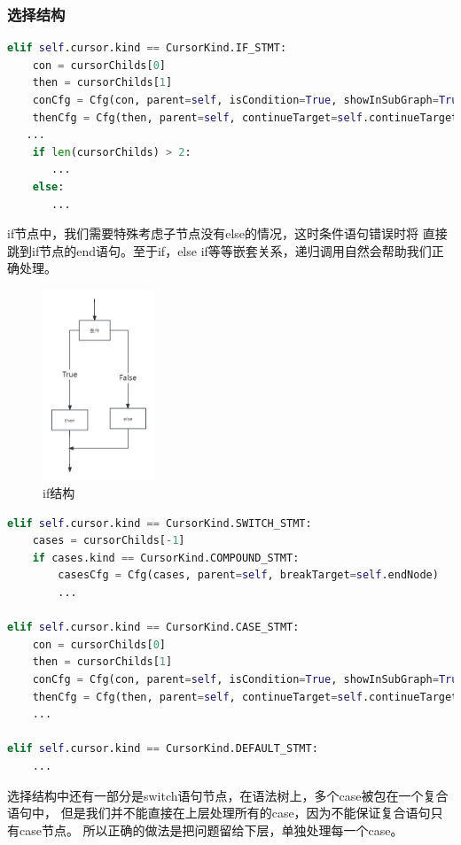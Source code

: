 \subsubsection{选择结构}
{\small
\begin{lstlisting}[language=Python]
elif self.cursor.kind == CursorKind.IF_STMT:
    con = cursorChilds[0]
    then = cursorChilds[1]
    conCfg = Cfg(con, parent=self, isCondition=True, showInSubGraph=True, label="IF_COND")
    thenCfg = Cfg(then, parent=self, continueTarget=self.continueTarget, breakTarget=self.breakTarget)
   ...
    if len(cursorChilds) > 2:
       ...
    else:
       ...
\end{lstlisting}
}
if节点中，我们需要特殊考虑子节点没有else的情况，这时条件语句错误时将
直接跳到if节点的end语句。至于if，else if等等嵌套关系，递归调用自然会帮助我们正确处理。
 \begin{figure}[htbp]
	\centering
	\includegraphics[width=0.3\textwidth]{pictures/if结构.png}
	\caption{if结构}
	\label{fig:if结构}
\end{figure}
{\small
\begin{lstlisting}[language=Python]
elif self.cursor.kind == CursorKind.SWITCH_STMT:
    cases = cursorChilds[-1]
    if cases.kind == CursorKind.COMPOUND_STMT:
        casesCfg = Cfg(cases, parent=self, breakTarget=self.endNode)
        ...

elif self.cursor.kind == CursorKind.CASE_STMT:
    con = cursorChilds[0]
    then = cursorChilds[1]
    conCfg = Cfg(con, parent=self, isCondition=True, showInSubGraph=True, label="CASE_COND")
    thenCfg = Cfg(then, parent=self, continueTarget=self.continueTarget, breakTarget=self.breakTarget)
    ...

elif self.cursor.kind == CursorKind.DEFAULT_STMT:
    ...
\end{lstlisting}
}
选择结构中还有一部分是switch语句节点，在语法树上，多个case被包在一个复合语句中，
但是我们并不能直接在上层处理所有的case，因为不能保证复合语句只有case节点。
所以正确的做法是把问题留给下层，单独处理每一个case。

